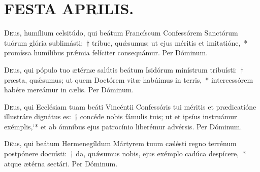 \documentclass[vesperale_romanum.tex]{subfiles}
\begin{document}
\section[Festa Aprilis]{FESTA APRILIS.}


\duplex

\oratio

\lettrine{D}{e}us, humílium celsitúdo, qui beátum Francíscum Confessórem San\-ctórum tuórum glória sublimásti:~† tríbue, quǽsumus; ut ejus méritis et imitatióne,~* promíssa humílibus prǽmia felíciter consequámur.
Per Dóminum.

\quadcommferiae

\myrule


\duplex

\oratio

\lettrine{D}{e}us, qui pópulo tuo ætérnæ salútis beátum Isidórum minístrum tribuísti:~† præsta, quǽsumus; ut quem Do\-ctórem vitæ habúimus in terris,~* intercessórem habére mereámur in cælis. Per Dóminum.

 \quadcommferiae
 
\capitdeseqquad

\myrule


\duplex

\oratio

\lettrine{D}{e}us, qui Ecclésiam tuam beáti Vincéntii Confessóris tui méritis et prædicatióne illustráre dignátus es:~† concéde nobis fámulis tuis; ut et i\-psíus instruámur exémplis,`* et ab ó\-mnibus ejus patrocínio liberémur advérsis. Per Dóminum.


\myrule

\newpage


\semiduplex

\hymnus



\oratio

\lettrine{D}{e}us, qui beátum Hermenegíldum Mártyrem tuum cælésti regno terrénum postpónere docuísti:~† da, quǽsumus nobis, ejus exémplo cadúca despícere,~* atque ætérna se\-ctári. Per Dóminum.
\end{document}
